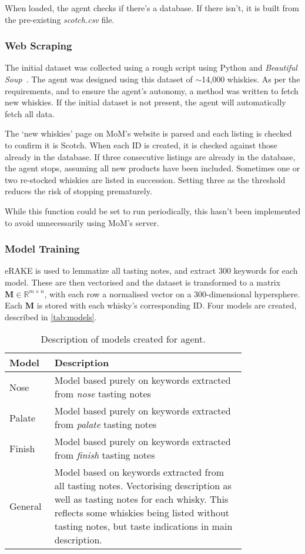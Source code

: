 When loaded, the agent checks if there's a database. If there isn't, it is built from the pre-existing \emph{scotch.csv} file.

\subsubsection{Web Scraping}\label{sssec:scrape}
The initial dataset was collected using a rough script using Python and \emph{Beautiful 
Soup}~\cite{richardson2007beautiful}. The agent was designed using this dataset of $\sim$14,000
whiskies.  As per the requirements, and to ensure the agent's autonomy, a method was written to fetch new
whiskies. If the initial dataset is not present, the agent will automatically fetch all data.

The `new whiskies' page on MoM's website is parsed and each listing
is checked to confirm it is Scotch.  When each ID is created, it is checked against those already in the
database.  If three consecutive listings are already in the database, the agent stops, assuming all new products
have been included. Sometimes one or two re-stocked whiskies are listed in succession.
Setting three as the threshold reduces the risk of stopping prematurely.

While this function could be set to run periodically, this hasn't been implemented to avoid unnecessarily 
using MoM's server.

\subsubsection{Model Training}
eRAKE is used to lemmatize all tasting notes, and extract 300 keywords for each model.  These are 
then vectorised and the dataset is transformed to a matrix $\textbf{M} \in \mathbb{R}^{m \times n}$, with each
row a normalised vector on a 300-dimensional hypersphere. Each $\textbf{M}$ is stored with each whisky's corresponding ID.
Four models are created, described in \autoref{tab:models}.

\begin{table}
    \centering
    \caption{Description of models created for agent.}\label{tab:models}
    \begin{tabular}{p{0.1\linewidth} p{0.7\linewidth}} 
    \toprule
    Model   & Description            \\ \midrule
    Nose    & Model based purely on keywords extracted from \emph{nose} tasting notes  \\
    Palate  & Model based purely on keywords extracted from \emph{palate} tasting notes  \\
    Finish  & Model based purely on keywords extracted from \emph{finish} tasting notes  \\
    General & Model based on keywords extracted from all tasting notes.  Vectorising description as well as tasting notes for each whisky. This reflects some whiskies being listed without tasting notes, but taste indications in main description. \\
    \bottomrule
    \end{tabular}
\end{table}

